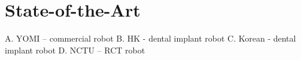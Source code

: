 \chapter{State-of-the-Art}
A.	YOMI – commercial robot
B.	HK - dental implant robot
C.	Korean - dental implant robot
D.	NCTU – RCT robot
						